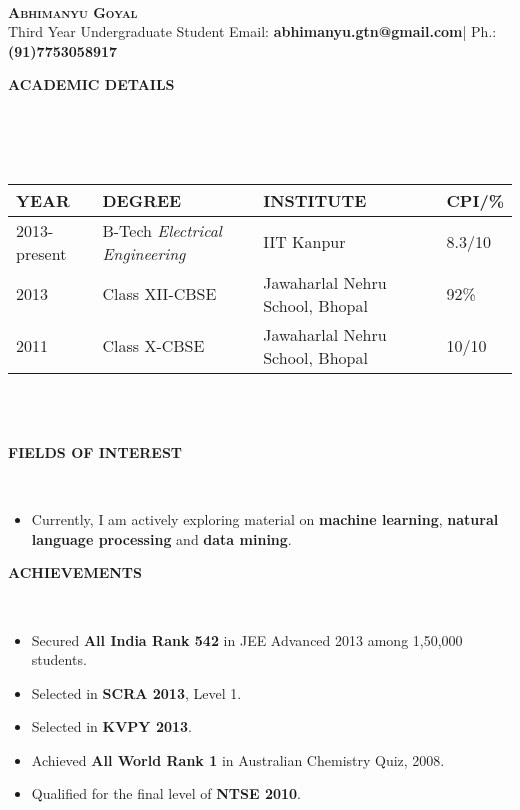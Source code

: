 \documentclass[a4paper,10pt]{article}
\newcommand{\isep}{-2 pt}
\newcommand{\lsep}{-0.5cm}
\newcommand{\resheading}[1]{{\small \colorbox{mygrey}{\begin{minipage}{0.975\textwidth}{\textbf{#1 \vphantom{p\^{E}}}}\end{minipage}}}}
\begin{document}
\hspace{0.5cm}\\[-0.2cm]

\textbf{\LARGE \textsc{Abhimanyu Goyal}}\\
\indent Third Year Undergraduate Student\hfill
Email: \textbf{abhimanyu.gtn@gmail.com}|
Ph.: \textbf{(91)7753058917} \\

\resheading{\textbf{ACADEMIC DETAILS} }\\[\lsep]
\\ \\
\indent \begin{tabular}{ L{3cm} L{6cm} L{8cm} L{2cm} }
\hline
\textbf{YEAR} & \textbf{DEGREE} & \textbf{INSTITUTE}  & \textbf{CPI/\%} \\
\hline

2013-present & B-Tech \emph{Electrical Engineering} & IIT Kanpur & 8.3/10 \\
2013 & Class XII-CBSE & Jawaharlal Nehru School, Bhopal  & 92\% \\
2011 & Class X-CBSE & Jawaharlal Nehru School, Bhopal & 10/10 \\
\hline
\end{tabular}
\\ \\

\resheading{\textbf{FIELDS OF INTEREST} }\\[\lsep]
\begin{itemize}\itemsep\isep
\item \noindent Currently, I am actively exploring material on \textbf{machine learning}, \textbf{natural language processing} and \textbf{data mining}.
\end{itemize}

\resheading{\textbf{ACHIEVEMENTS} }\\[\lsep]
\begin{itemize}\itemsep \isep
\item \noindent Secured \textbf{All India Rank 542} in JEE Advanced 2013 among 1,50,000 students.
\item \noindent Selected in \textbf{SCRA 2013}, Level 1.
\item \noindent Selected in \textbf{KVPY 2013}.
\item \noindent Achieved \textbf{All  World Rank 1} in Australian Chemistry Quiz, 2008.
\item \noindent Qualified for the final level of \textbf{NTSE 2010}.

\end{itemize}
\end{document}
